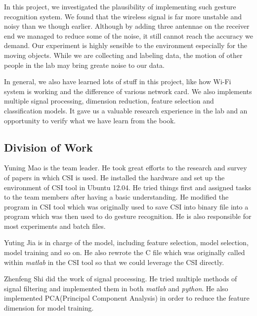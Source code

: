 \documentclass[conference]{IEEEtran}
\begin{document}
In this project, we investigated the plausibility of implementing such gesture recognition system. We found that the wireless signal is far more unstable and noisy than we though earlier. Although by adding three antennae on the receiver end we managed to reduce some of the noise, it still cannot reach the accuracy we demand. Our experiment is highly sensible to the environment especially for the moving objects. While we are collecting and labeling data, the motion of other people in the lab may bring greate noise to our data.

In general, we also have learned lots of stuff in this project, like how Wi-Fi system is working and the difference of various network card. We also implements multiple signal processing, dimension reduction, feature selection and classification models. It gave us a valuable research experience in the lab and an opportunity to verify what we have learn from the book.

\subsection{Division of Work}
Yuning Mao is the team leader. He took great efforts to the research and survey of papers in which CSI is used. He installed the hardware and set up the environment of CSI tool in Ubuntu 12.04. He tried things first and assigned tasks to the team members after having a basic understanding. He modified the program in CSI tool which was originally used to save CSI into binary file into a program which was then used to do gesture recognition. He is also responsible for most experiments and batch files.

Yuting Jia is in charge of the model, including feature selection, model selection, model training and so on. He also rewrote the C file which was originally called within \emph{matlab} in the CSI tool so that we could leverage the CSI directly.

Zhenfeng Shi did the work of signal processing. He tried multiple methods of signal filtering and implemented them in both \emph{matlab} and \emph{python}. He also implemented PCA(Principal Component Analysis) in order to reduce the feature dimension for model training.
\end{document}
